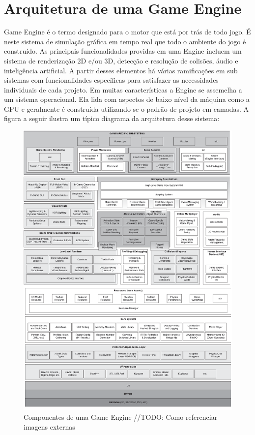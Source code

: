 \documentclass[12pt, 
openright, 
oneside, 
a4paper,    
brazil]{facom-ufu-abntex2}
\begin{document}
\chapter{Arquitetura de uma Game Engine}
Game Engine é o termo designado para o motor que está por trás de todo jogo. É neste sistema de simulação gráfica em tempo real que todo o ambiente do jogo é construído. As principais funcionalidades providas em uma Engine incluem um sistema de renderização 2D e/ou 3D, detecção e resolução de colisões, áudio e inteligência artificial. A partir desses elementos há várias ramificações em sub sistemas com funcionalidades específicas para satisfazer as necessidades individuais de cada projeto. Em muitas características a Engine se assemelha a um sistema operacional. Ela lida com aspectos de baixo nível da máquina como a GPU e geralmente é construída utilizando-se o padrão de projeto em camadas. A figura a seguir ilustra um típico diagrama da arquitetura desse sistema:
\begin{figure}[H]
	\centering
	\includegraphics[width=\textwidth]{imagens/engine_layers.png}
	\caption{Componentes de uma Game Engine //TODO: Como referenciar imagens externas}
\end{figure}
\end{document}
